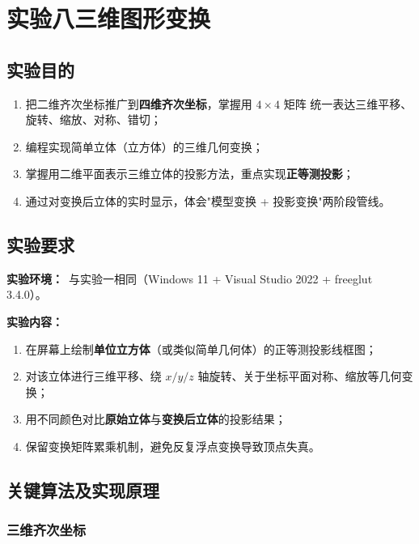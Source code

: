 \documentclass[a4paper,12pt]{ctexart}
\begin{document}
\clearpage
\section{实验八\quad 三维图形变换}

\subsection{实验目的}

\begin{enumerate}[leftmargin=2em,itemsep=0.2em]
    \item 把二维齐次坐标推广到\textbf{四维齐次坐标}，掌握用 $4\times 4$ 矩阵
        统一表达三维平移、旋转、缩放、对称、错切；
    \item 编程实现简单立体（立方体）的三维几何变换；
    \item 掌握用二维平面表示三维立体的投影方法，重点实现\textbf{正等测投影}；
    \item 通过对变换后立体的实时显示，体会"模型变换 + 投影变换"两阶段管线。
\end{enumerate}

\subsection{实验要求}

\textbf{实验环境：}\ 与实验一相同（Windows 11 + Visual Studio 2022 + freeglut 3.4.0）。

\textbf{实验内容：}
\begin{enumerate}[leftmargin=2em,itemsep=0.2em]
    \item 在屏幕上绘制\textbf{单位立方体}（或类似简单几何体）的正等测投影线框图；
    \item 对该立体进行三维平移、绕 $x/y/z$ 轴旋转、关于坐标平面对称、缩放等几何变换；
    \item 用不同颜色对比\textbf{原始立体}与\textbf{变换后立体}的投影结果；
    \item 保留变换矩阵累乘机制，避免反复浮点变换导致顶点失真。
\end{enumerate}

\subsection{关键算法及实现原理}

\subsubsection{三维齐次坐标}
\end{document}
